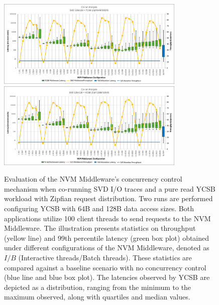 \begin{figure}
  \centering
  \includegraphics[width=0.8\textwidth,height=\textheight,keepaspectratio,angle=0]{images/64b_100_0_middleware_eval.png}
  \includegraphics[width=0.8\textwidth,height=\textheight,keepaspectratio,angle=0]{images/128b_100_0_middleware_eval.png}
  \caption[Evaluation of NVM Middleware: Benchmark B]{Evaluation of the NVM Middleware's concurrency control mechanism when co-running SVD I/O traces and a pure read YCSB workload with Zipfian request distribution. Two runs are performed configuring YCSB with 64B and 128B data access sizes. Both applications utilize 100 client threads to send requests to the NVM Middleware.  The illustration presents statistics on throughput (yellow line) and 99th percentile latency (green box plot) obtained under different configurations of the NVM Middleware, denoted as $I/B$ (Interactive threads/Batch threads). These statistics are compared against a baseline scenario with no concurrency control (blue line and blue box plot). The latencies observed by YCSB are depicted as a distribution, ranging from the minimum to the maximum observed, along with quartiles and median values.}
  \label{fig:100_0_middleware_eval}
\end{figure}

